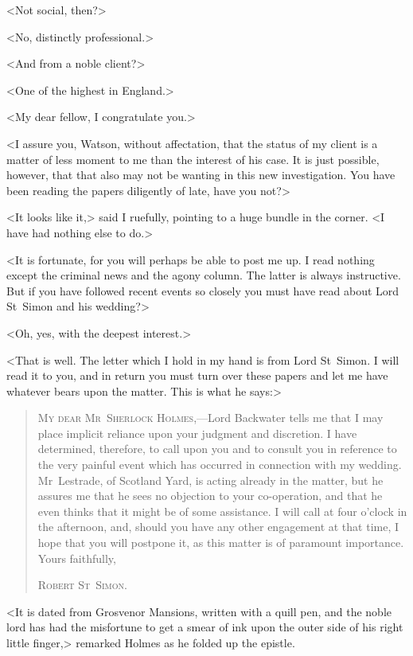 <Not social, then?>

<No, distinctly professional.>

<And from a noble client?>

<One of the highest in England.>

<My dear fellow, I congratulate you.>

<I assure you, Watson, without affectation, that the status of my client is a matter of less moment to me than the interest of his case. It is just possible, however, that that also may not be wanting in this new investigation. You have been reading the papers diligently of late, have you not?>

<It looks like it,> said I ruefully, pointing to a huge bundle in the corner. <I have had nothing else to do.>

<It is fortunate, for you will perhaps be able to post me up. I read nothing except the criminal news and the agony column. The latter is always instructive. But if you have followed recent events so closely you must have read about Lord St~Simon and his wedding?>

<Oh, yes, with the deepest interest.>

<That is well. The letter which I hold in my hand is from Lord St~Simon. I will read it to you, and in return you must turn over these papers and let me have whatever bears upon the matter. This is what he says:>

\begin{quote}
\textsc{My dear Mr~Sherlock Holmes},—Lord Backwater tells me that I may place implicit reliance upon your judgment and discretion. I have determined, therefore, to call upon you and to consult you in reference to the very painful event which has occurred in connection with my wedding. Mr~Lestrade, of Scotland Yard, is acting already in the matter, but he assures me that he sees no objection to your co-operation, and that he even thinks that it might be of some assistance. I will call at four o'clock in the afternoon, and, should you have any other engagement at that time, I hope that you will postpone it, as this matter is of paramount importance. Yours faithfully,
\begin{flushright}
\textsc{Robert St~Simon.}
\end{flushright}
\end{quote}

<It is dated from Grosvenor Mansions, written with a quill pen, and the noble lord has had the misfortune to get a smear of ink upon the outer side of his right little finger,> remarked Holmes as he folded up the epistle.

